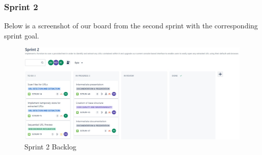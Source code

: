 \subsubsection{Sprint 2}
Below is a screenshot of our board from the second sprint with the corresponding sprint goal.
\begin{figure}[h!]
    \centering
    \includegraphics[width=1\textwidth]{pictures/Scrum/Sprint 2/Sprint2_Backlog}
    \caption{Sprint 2 Backlog}
    \label{fig:sprint_2_backlog}
\end{figure}


